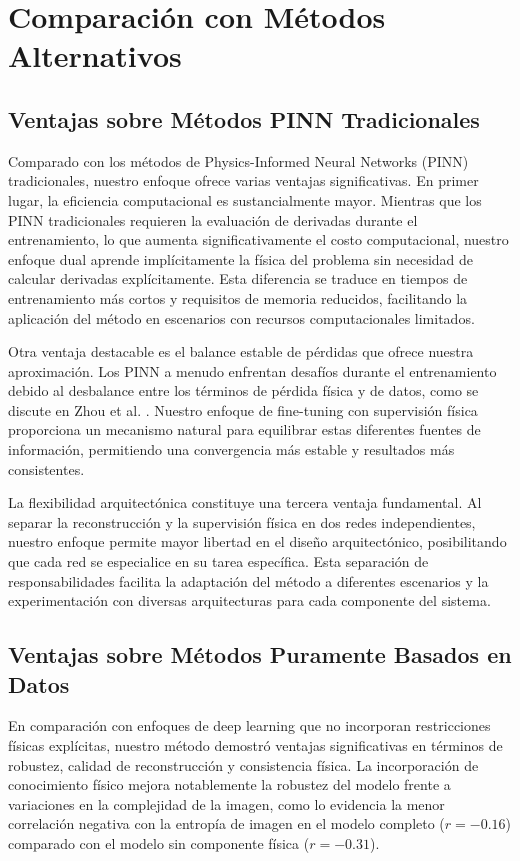 \section{Comparación con Métodos Alternativos}

\subsection{Ventajas sobre Métodos PINN Tradicionales}

Comparado con los métodos de Physics-Informed Neural Networks (PINN) tradicionales, nuestro enfoque ofrece varias ventajas significativas. En primer lugar, la eficiencia computacional es sustancialmente mayor. Mientras que los PINN tradicionales requieren la evaluación de derivadas durante el entrenamiento, lo que aumenta significativamente el costo computacional, nuestro enfoque dual aprende implícitamente la física del problema sin necesidad de calcular derivadas explícitamente. Esta diferencia se traduce en tiempos de entrenamiento más cortos y requisitos de memoria reducidos, facilitando la aplicación del método en escenarios con recursos computacionales limitados.

Otra ventaja destacable es el balance estable de pérdidas que ofrece nuestra aproximación. Los PINN a menudo enfrentan desafíos durante el entrenamiento debido al desbalance entre los términos de pérdida física y de datos, como se discute en Zhou et al. \cite{zhou2020physics}. Nuestro enfoque de fine-tuning con supervisión física proporciona un mecanismo natural para equilibrar estas diferentes fuentes de información, permitiendo una convergencia más estable y resultados más consistentes.

La flexibilidad arquitectónica constituye una tercera ventaja fundamental. Al separar la reconstrucción y la supervisión física en dos redes independientes, nuestro enfoque permite mayor libertad en el diseño arquitectónico, posibilitando que cada red se especialice en su tarea específica. Esta separación de responsabilidades facilita la adaptación del método a diferentes escenarios y la experimentación con diversas arquitecturas para cada componente del sistema.

\subsection{Ventajas sobre Métodos Puramente Basados en Datos}

En comparación con enfoques de deep learning que no incorporan restricciones físicas explícitas, nuestro método demostró ventajas significativas en términos de robustez, calidad de reconstrucción y consistencia física. La incorporación de conocimiento físico mejora notablemente la robustez del modelo frente a variaciones en la complejidad de la imagen, como lo evidencia la menor correlación negativa con la entropía de imagen en el modelo completo ($r=-0.16$) comparado con el modelo sin componente física ($r=-0.31$).

